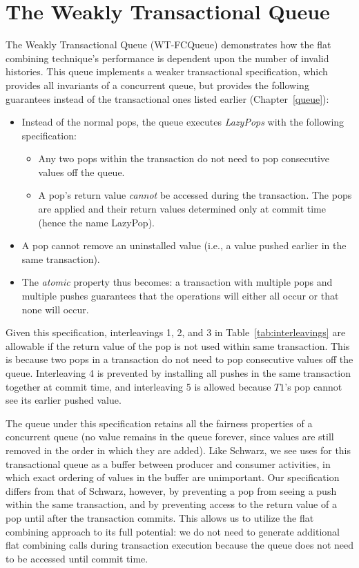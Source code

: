 \section{The Weakly Transactional Queue} 

The Weakly Transactional Queue (WT-FCQueue) demonstrates how the flat combining technique's performance is dependent upon the number of invalid histories. This queue implements a weaker transactional specification, which provides all invariants of a concurrent queue, but provides the following guarantees instead of the transactional ones listed earlier (Chapter~\ref{queue}):
\begin{itemize}
    \item Instead of the normal pops, the queue executes \emph{LazyPops} with the following specification:
        \begin{itemize}
            \item Any two pops within the transaction do not need to pop consecutive values off the queue.
            \item A pop's return value \emph{cannot} be accessed during the transaction. The pops are applied and their return values determined only at commit time (hence the name LazyPop). 
        \end{itemize}
    \item A pop cannot remove an uninstalled value (i.e., a value pushed earlier in the same transaction).
    \item The \emph{atomic} property thus becomes: a transaction with multiple pops and multiple pushes guarantees that the operations will either all occur or that none will occur.
\end{itemize}

Given this specification, interleavings 1, 2, and 3 in Table~\ref{tab:interleavings} are allowable if the return value of the pop is not used within same transaction. This is because two pops in a transaction do not need to pop consecutive values off the queue. Interleaving 4 is prevented by installing all pushes in the same transaction together at commit time, and interleaving 5 is allowed because $T1$'s pop cannot see its earlier pushed value.

The queue under this specification retains all the fairness properties of a concurrent queue (no value remains in the queue forever, since values are still removed in the order in which they are added). Like Schwarz\cite{schwarz}, we see uses for this transactional queue as a buffer between producer and consumer activities, in which exact ordering of values in the buffer are unimportant.
Our specification differs from that of Schwarz\cite{schwarz}, however, by preventing a pop from seeing a push within the same transaction, and by preventing access to the return value of a pop until after the transaction commits. This allows us to utilize the flat combining approach to its full potential: we do not need to generate additional flat combining calls during transaction execution because the queue does not need to be accessed until commit time.

